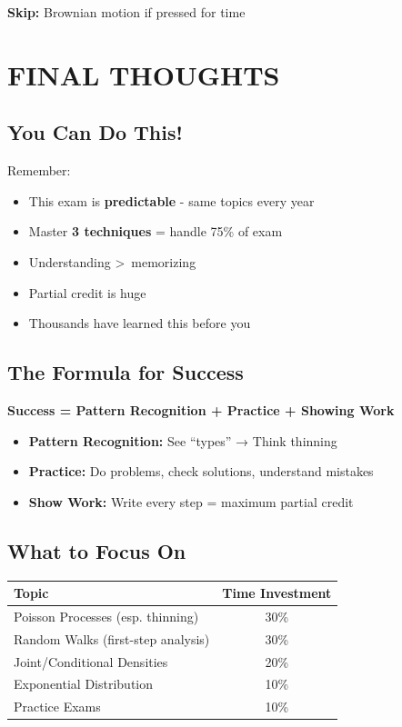 \documentclass[10pt,letterpaper]{article}
\begin{document}
\textbf{Skip:} Brownian motion if pressed for time

\newpage

\section{FINAL THOUGHTS}

\subsection{You Can Do This!}

Remember:
\begin{itemize}[leftmargin=*]
  \item This exam is \textbf{predictable} - same topics every year
  \item Master \textbf{3 techniques} = handle 75\% of exam
  \item Understanding \textgreater\ memorizing
  \item Partial credit is huge
  \item Thousands have learned this before you
\end{itemize}

\subsection{The Formula for Success}

\begin{tcolorbox}[colback=yellow!20,colframe=orange!80,arc=3mm]
\centering
\Large
\textbf{Success = Pattern Recognition + Practice + Showing Work}

\vspace{0.3cm}

\normalsize
\begin{itemize}[leftmargin=2cm]
  \item \textbf{Pattern Recognition:} See ``types'' → Think thinning
  \item \textbf{Practice:} Do problems, check solutions, understand mistakes
  \item \textbf{Show Work:} Write every step = maximum partial credit
\end{itemize}
\end{tcolorbox}

\subsection{What to Focus On}

\begin{table}[h]
\centering
\begin{tabularx}{0.9\textwidth}{Xc}
\toprule
\textbf{Topic} & \textbf{Time Investment} \\
\midrule
Poisson Processes (esp. thinning) & 30\% \\
Random Walks (first-step analysis) & 30\% \\
Joint/Conditional Densities & 20\% \\
Exponential Distribution & 10\% \\
Practice Exams & 10\% \\
\bottomrule
\end{tabularx}
\end{table}
\end{document}
